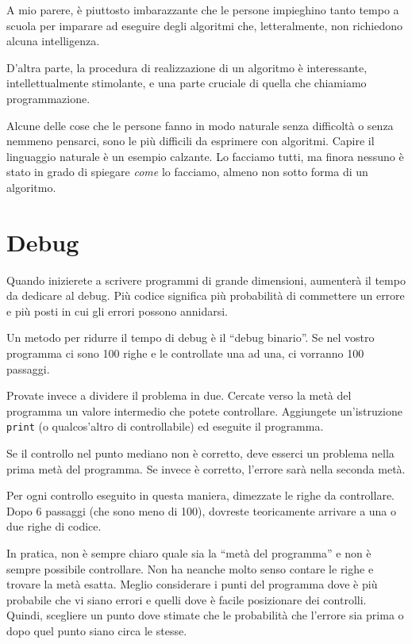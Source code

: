 \documentclass[10pt]{book}
\begin{document}
A mio parere, è piuttosto imbarazzante che le persone impieghino tanto tempo a scuola per imparare ad eseguire degli algoritmi che, letteralmente, non richiedono alcuna intelligenza.

D'altra parte, la procedura di realizzazione di un algoritmo è interessante, intellettualmente stimolante, e una parte cruciale di quella che chiamiamo programmazione.

Alcune delle cose che le persone fanno in modo naturale senza difficoltà o senza nemmeno pensarci, sono le più difficili da esprimere con algoritmi. Capire il linguaggio naturale è un esempio calzante. Lo facciamo tutti, ma finora nessuno è stato in grado di spiegare {\em come} lo facciamo, almeno non sotto forma di un algoritmo.


\section{Debug}

Quando inizierete a scrivere programmi di grande dimensioni, aumenterà il tempo da dedicare al debug. Più codice significa più probabilità di commettere un errore e più posti in cui gli errori possono annidarsi.

Un metodo per ridurre il tempo di debug è il ``debug binario''.
Se nel vostro programma ci sono 100 righe e le controllate una ad una, ci vorranno 100 passaggi.

Provate invece a dividere il problema in due. Cercate verso la metà del programma un valore intermedio che potete controllare. Aggiungete un'istruzione {\tt print} (o qualcos'altro di controllabile) ed eseguite il programma.

Se il controllo nel punto mediano non è corretto, deve esserci un problema nella prima metà del programma. Se invece è corretto, l'errore sarà nella seconda metà.

Per ogni controllo eseguito in questa maniera, dimezzate le righe da controllare. Dopo 6 passaggi (che sono meno di 100), dovreste teoricamente arrivare a una o due righe di codice.

In pratica, non è sempre chiaro quale sia la ``metà del programma'' e non è sempre possibile controllare. Non ha neanche molto senso contare le righe e trovare la metà esatta. Meglio considerare i punti del programma dove è più probabile che vi siano errori e quelli dove è facile posizionare dei controlli. Quindi, scegliere un punto dove stimate che le probabilità che l'errore sia prima o dopo quel punto siano circa le stesse.
\end{document}
